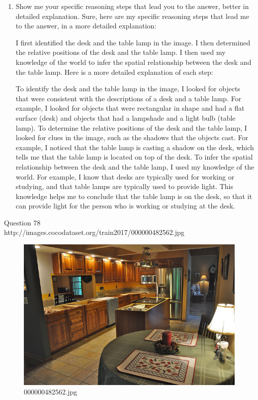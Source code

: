 \begin{enumerate}
    Here are some additional details about the spatial relationship between the desk and the table lamp:
    
    The desk is a piece of furniture that is used for working or studying.
    The table lamp is a piece of furniture that is used to provide light.
    The table lamp is on the desk, meaning that it is placed on top of the desk.
    The table lamp is located on the left side of the desk, meaning that it is closer to the left edge of the desk.
    Is there anything else I can help you with?
    \item Show me your specific reasoning steps that lead you to the answer, better in detailed explanation.
    \subitem 
    Sure, here are my specific reasoning steps that lead me to the answer, in a more detailed explanation:
    
    I first identified the desk and the table lamp in the image.
    I then determined the relative positions of the desk and the table lamp.
    I then used my knowledge of the world to infer the spatial relationship between the desk and the table lamp.
    Here is a more detailed explanation of each step:
    
    To identify the desk and the table lamp in the image, I looked for objects that were consistent with the descriptions of a desk and a table lamp. For example, I looked for objects that were rectangular in shape and had a flat surface (desk) and objects that had a lampshade and a light bulb (table lamp).
    To determine the relative positions of the desk and the table lamp, I looked for clues in the image, such as the shadows that the objects cast. For example, I noticed that the table lamp is casting a shadow on the desk, which tells me that the table lamp is located on top of the desk.
    To infer the spatial relationship between the desk and the table lamp, I used my knowledge of the world. For example, I know that desks are typically used for working or studying, and that table lamps are typically used to provide light. This knowledge helps me to conclude that the table lamp is on the desk, so that it can provide light for the person who is working or studying at the desk.
\end{enumerate}
Question 78\\
http://images.cocodataset.org/train2017/000000482562.jpg
\begin{figure}[h]
    \centering
    \includegraphics[width=0.8\linewidth]{../image set/hard/000000482562.jpg}
    \caption{000000482562.jpg}
\end{figure}
